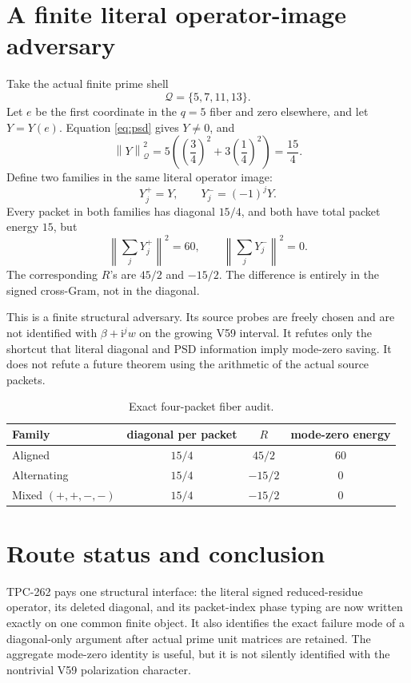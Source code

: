 \documentclass[11pt]{article}
\newcommand{\norm}[1]{\left\lVert #1\right\rVert}
\newcommand{\ii}{\mathrm i}
\newcommand{\Qp}{\mathcal Q}
\begin{document}
\section{A finite literal operator-image adversary}
Take the actual finite prime shell
\begin{equation}
\Qp=\{5,7,11,13\}.
\label{eq:shell}
\end{equation}
Let \(e\) be the first coordinate in the \(q=5\) fiber and zero elsewhere,
and let \(Y=Y(e)\).  Equation \eqref{eq:psd} gives \(Y\neq0\), and
\begin{equation}
\norm{Y}_{\Qp}^2
=5\left(\left(\frac34\right)^2+3\left(\frac14\right)^2\right)
=\frac{15}{4}.
\label{eq:probe}
\end{equation}
Define two families in the same literal operator image:
\begin{equation}
Y_j^+=Y,\qquad Y_j^-=(-1)^jY.
\label{eq:adversary}
\end{equation}
Every packet in both families has diagonal \(15/4\), and both have total
packet energy \(15\), but
\begin{equation}
\norm{\sum_jY_j^+}^2=60,\qquad
\norm{\sum_jY_j^-}^2=0.
\label{eq:endpoints}
\end{equation}
The corresponding \(R\)'s are \(45/2\) and \(-15/2\).  The difference is
entirely in the signed cross-Gram, not in the diagonal.

This is a finite structural adversary.  Its source probes are freely chosen
and are not identified with \(\beta+\ii^jw\) on the growing V59 interval.
It refutes only the shortcut that literal diagonal and PSD information imply
mode-zero saving.  It does not refute a future theorem using the arithmetic
of the actual source packets.

\begin{table}[t]
\centering
\caption{Exact four-packet fiber audit.}
\begin{tabular}{lccc}
\toprule
Family & diagonal per packet & \(R\) & mode-zero energy\\
\midrule
Aligned & \(15/4\) & \(45/2\) & \(60\)\\
Alternating & \(15/4\) & \(-15/2\) & \(0\)\\
Mixed \((+,+,-,-)\) & \(15/4\) & \(-15/2\) & \(0\)\\
\bottomrule
\end{tabular}
\end{table}

\section{Route status and conclusion}
TPC-262 pays one structural interface: the literal signed reduced-residue
operator, its deleted diagonal, and its packet-index phase typing are now
written exactly on one common finite object.  It also identifies the exact
failure mode of a diagonal-only argument after actual prime unit matrices are
retained.  The aggregate mode-zero identity is useful, but it is not silently
identified with the nontrivial V59 polarization character.
\end{document}
